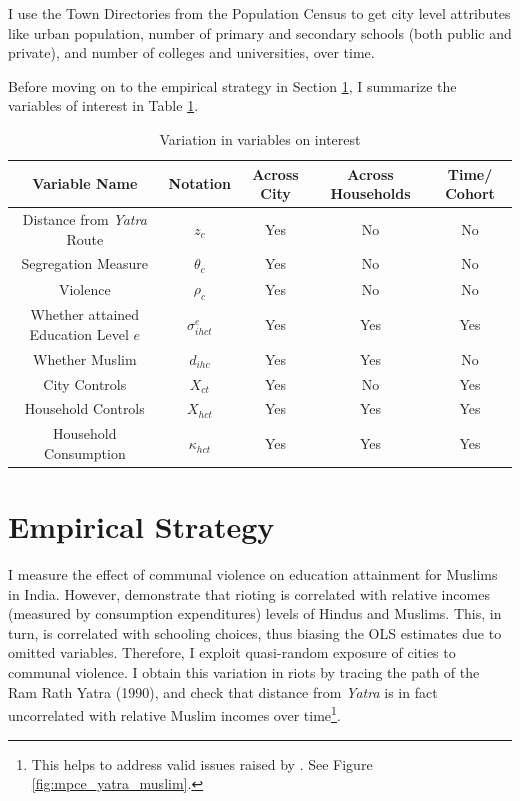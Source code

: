 \documentclass{article}
\begin{document}
I use the Town Directories from the Population Census to get city level attributes like urban population, number of primary and secondary schools (both public and private), and number of colleges and universities, over time. 

Before moving on to the empirical strategy in Section \ref{empirical_strategy}, I summarize the variables of interest in Table \ref{tab:variables}.

\begin{table}[h!]
\centering
\begin{tabular}{ccccc}
\hline Variable Name & Notation & Across City & Across Households & Time/ Cohort  \\ 
    \midrule
    Distance from \textit{Yatra} Route &   $z_{c}$ & Yes & No & No \\
    Segregation Measure & $\theta_c$ & Yes & No & No \\
    Violence & $\rho_{c}$ & Yes & No & No \\
    Whether attained Education Level $e$ & $\sigma_{ihct}^e$ & Yes & Yes & Yes  \\
    Whether Muslim & $d_{ihc}$ & Yes & Yes & No \\
    City Controls & $X_{ct}$ & Yes & No & Yes \\
    Household Controls & $X_{hct}$ & Yes & Yes & Yes \\
    Household Consumption & $\kappa_{hct}$ & Yes & Yes & Yes \\
    \hline
\end{tabular}
\caption{Variation in variables on interest}
\label{tab:variables}
\end{table}

\section{Empirical Strategy}\label{empirical_strategy}
I measure the effect of communal violence on education attainment for Muslims in India. However, \cite{mitra.2014} demonstrate that rioting is correlated with relative incomes (measured by consumption expenditures) levels of Hindus and Muslims. This, in turn, is correlated with schooling choices, thus biasing the OLS estimates due to omitted variables. Therefore, I exploit quasi-random exposure of cities to communal violence. I obtain this variation in riots by tracing the path of the {Ram Rath Yatra} (1990), and check that distance from \textit{Yatra} is in fact uncorrelated with relative Muslim incomes over time\footnote{This helps to address valid issues raised by \cite{mitra.2014}. See Figure \ref{fig:mpce_yatra_muslim}.}. 
\end{document}
